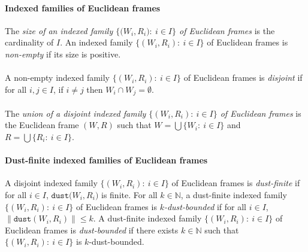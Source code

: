 \documentclass[draft]{article}
\newtheorem{lemma}{Lemma}
\def\N{\mathbb{N}}
\def\dust{\mathtt{dust}}
\def\kernel{\mathtt{kernel}}
\begin{document}
\paragraph{Indexed families of Euclidean frames}
%
%
The {\it size of an indexed family $\{(W_{i},
%
%
%
%
%
%
%
%
%
%
%
%
$\linebreak$
%
%
%
%
%
%
%
%
%
%
%
%
R_{i}):\ i{\in}I\}$ of Euclidean frames}\/ is the cardinality of $I$.
An indexed family $\{(W_{i},R_{i}):\ i{\in}I\}$ of Euclidean frames is {\it non-empty}\/ if its size is positive.
%
%
\\
\\
%
%
A non-empty indexed family $\{(W_{i},R_{i}):\ i{\in}I\}$ of Euclidean frames is {\it disjoint}\/ if for all $i,j{\in}I$, if $i{\not=}j$ then $W_{i}{\cap}W_{j}{=}\emptyset$.
%
%
\\
\\
%
%
The {\it union of a disjoint indexed family $\{(W_{i},R_{i}):\ i{\in}I\}$ of Euclidean frames}\/ is the Euclidean frame $(W,R)$ such that $W{=}\bigcup\{W_{i}:\ i{\in}I\}$ and $R{=}\bigcup\{R_{i}:\ i{\in}I\}$.
%
%
%
%
%
%
%
%
%
%
\paragraph{Dust-finite indexed families of Euclidean frames}
%
%
A disjoint indexed family $\{(W_{i},R_{i}):\ i{\in}I\}$ of Euclidean frames is {\it dust-finite}\/ if for all $i{\in}I$, $\dust(W_{i},
%
%
%
%
%
%
%
%
%
%
%
%
$\linebreak$
%
%
%
%
%
%
%
%
%
%
%
%
R_{i})$ is finite.
For all $k{\in}\N$, a dust-finite indexed family $\{(W_{i},R_{i}):\ i{\in}I\}$ of Euclidean frames is {\it $k$-dust-bounded}\/ if for all $i{\in}I$, ${\parallel}\dust(W_{i},R_{i}){\parallel}{\leq}k$.
A dust-finite indexed family $\{(W_{i},R_{i}):\ i{\in}I\}$ of Euclidean frames is {\it dust-bounded}\/ if there exists $k{\in}\N$ such that $\{(W_{i},R_{i}):\ i{\in}I\}$ is $k$-dust-bounded.
%
%
%
%
%
%
%
%
%
%
\end{document}
